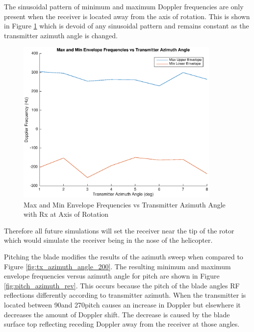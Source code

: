 The sinusoidal pattern of minimum and maximum Doppler frequencies are only present when the receiver is located away from the axis of rotation. This is shown in Figure \ref{fig:tx_azimuth_rx0} which is devoid of any sinusoidal pattern and remains constant as the transmitter azimuth angle is changed. 

\begin{figure}
	\begin{center}
		\includegraphics[width=10cm]{images/simulation/Azimuth_angle_rx0_max_doppler.eps}
		\caption{Max and Min Envelope Frequencies vs Transmitter Azimuth Angle with Rx at Axis of Rotation}
		\label{fig:tx_azimuth_rx0}
	\end{center}
\end{figure}

Therefore all future simulations will set the receiver near the tip of the rotor which would simulate the receiver being in the nose of the helicopter.

Pitching the blade modifies the results of the azimuth sweep when compared to Figure \ref{fig:tx_azimuth_angle_200}. The resulting minimum and maximum envelope frequencies versus azimuth angle for pitch are shown in Figure \ref{fig:pitch_azimuth_rev}. This occurs because the pitch of the blade angles RF reflections differently according to transmitter azimuth. When the transmitter is located between 90\textdegree \space and 270\textdegree \space pitch causes an increase in Doppler but elsewhere it decreases the amount of Doppler shift. The decrease is caused by the blade surface top reflecting receding Doppler away from the receiver at those angles.

